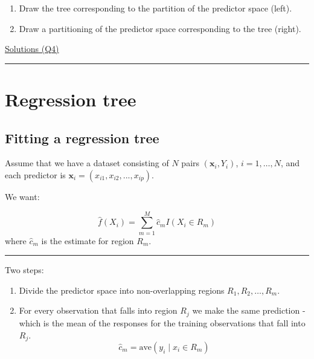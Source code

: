\documentclass[
  letterpaper,
  DIV=11,
  numbers=noendperiod]{scrartcl}
\providecommand{\tightlist}{%
  \setlength{\itemsep}{0pt}\setlength{\parskip}{0pt}}\usepackage{longtable,booktabs,array}
\begin{document}
\begin{enumerate}
\def\labelenumi{\arabic{enumi})}
\item
  Draw the tree corresponding to the partition of the predictor space
  (left).
\item
  Draw a partitioning of the predictor space corresponding to the tree
  (right).
\end{enumerate}

\href{https://rstudio-pubs-static.s3.amazonaws.com/65564_925dfde884e14ef9b5735eddd16c263e.html}{Solutions
(Q4)}

\begin{center}\rule{0.5\linewidth}{0.5pt}\end{center}

\hypertarget{regression-tree}{%
\section{Regression tree}\label{regression-tree}}

\hypertarget{fitting-a-regression-tree}{%
\subsection{Fitting a regression tree}\label{fitting-a-regression-tree}}

Assume that we have a dataset consisting of \(N\) pairs
\(({\mathbf x}_i,Y_i)\), \(i=1,\ldots,N\), and each predictor is
\({\mathbf x}_i=(x_{i1},x_{i2},...,x_{ip})\).

We want:

\[\hat{f}(X_i)=\sum_{m=1}^M \hat{c}_m I(X_i \in R_m)\] where
\(\hat{c}_m\) is the estimate for region \(R_m\).

\begin{center}\rule{0.5\linewidth}{0.5pt}\end{center}

Two steps:

\begin{enumerate}
\def\labelenumi{\arabic{enumi}.}
\tightlist
\item
  Divide the predictor space into non-overlapping regions
  \(R_1,R_2,\ldots,R_m\).
\item
  For every observation that falls into region \(R_j\) we make the same
  prediction - which is the mean of the responses for the training
  observations that fall into \(R_j\).
  \[\hat{c}_m=\text{ave}(y_i \mid x_i \in R_m)\]
\end{enumerate}
\end{document}
